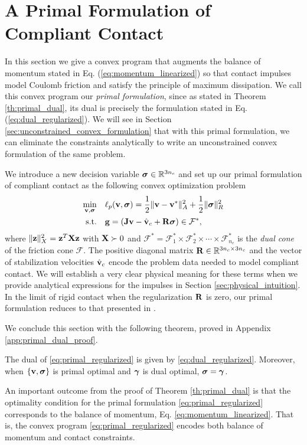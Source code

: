 \section{A Primal Formulation of Compliant Contact}
\label{sec:primal_formulation}

In this section we give a convex program that augments the balance of momentum
stated in Eq. (\ref{eq:momentum_linearized}) so that contact impulses model
Coulomb friction and satisfy the principle of maximum dissipation. We call this
convex program our \emph{primal formulation}, since as stated in Theorem
\ref{th:primal_dual}, its dual is precisely the formulation stated in Eq.
(\ref{eq:dual_regularized}). We will see in Section
\ref{sec:unconstrained_convex_formulation} that with this primal formulation, we
can eliminate the constraints analytically to write an unconstrained convex
formulation of the same problem.

We introduce a new decision variable ${\bm{\sigma}}\in\mathbb{R}^{3n_c}$ and set
up our primal formulation of compliant contact as the following convex
optimization problem
\begin{equation}
	\begin{aligned}
	\min_{\mf{v},\bsigma} \quad & \ell_p(\mf{v},\bsigma) =
	\frac{1}{2}\Vert\mf{v}-\mf{v}^*\Vert_{A}^2 +
	\frac{1}{2} \Vert\bsigma\Vert_{R}^2\\
	\textrm{s.t.} \quad & \mf{g} = (\mf{J}\mf{v}-\hat{\mf{v}}_c + \mf{R}\bsigma) \in \mathcal{F}^*,\\
	\end{aligned}
	\label{eq:primal_regularized}
\end{equation}
where $\Vert{\mathbf{z}}\Vert_X^2={\mathbf{z}}^T{\mathbf{X}}{\mathbf{z}}$ with ${\mathbf{X}}\succ 0$ and
$\mathcal{F^*}= \mathcal{F}^*_1 \times \mathcal{F}^*_2 \times \cdots \times
\mathcal{F}^*_{n_c}$ is the \emph{dual cone} of the friction cone $\mathcal{F}$.
The positive diagonal matrix ${\mathbf{R}}\in\mathbb{R}^{3n_c\times 3n_c}$ and the
vector of stabilization velocities $\hat{{\mathbf{v}}}_c$ encode the problem data
needed to model compliant contact. We will establish a very clear physical
meaning for these terms when we provide analytical expressions for the impulses
in Section \ref{sec:physical_intuition}. In the limit of rigid contact when the
regularization ${\mathbf{R}}$ is zero, our primal formulation reduces to that
presented in \cite{bib:mazhar2014}.

We conclude this section with the following theorem, proved in Appendix
\ref{app:primal_dual_proof}.

\begin{theorem}\label{th:primal_dual} The dual of \eqref{eq:primal_regularized}
is given by \eqref{eq:dual_regularized}. Moreover, when $\{{\mathbf{v}},{\bm\sigma}\}$ is
primal optimal and ${\bm\gamma}$ is dual optimal, ${\bm\sigma} = {\bm\gamma}$.
\end{theorem}

An important outcome from the proof of Theorem \ref{th:primal_dual} is that the
optimality condition for the primal formulation \eqref{eq:primal_regularized}
corresponds to the balance of momentum, Eq. \eqref{eq:momentum_linearized}. That
is, the convex program \eqref{eq:primal_regularized} encodes both balance of
momentum and contact constraints.
